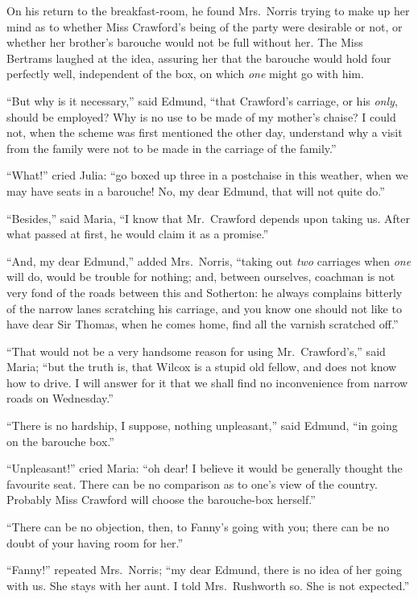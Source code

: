 \documentclass{article}
\begin{document}
On his return to the breakfast-room, he found Mrs.\ Norris
trying to make up her mind as to whether Miss Crawford's
being of the party were desirable or not, or whether
her brother's barouche would not be full without her.
The Miss Bertrams laughed at the idea, assuring her
that the barouche would hold four perfectly well,
independent of the box, on which \emph{one} might go with him.

``But why is it necessary,'' said Edmund, ``that Crawford's carriage,
or his \emph{only}, should be employed?  Why is no use to be
made of my mother's chaise?  I could not, when the scheme
was first mentioned the other day, understand why a visit
from the family were not to be made in the carriage of the family.''

``What!'' cried Julia:  ``go boxed up three in a postchaise
in this weather, when we may have seats in a barouche!
No, my dear Edmund, that will not quite do.''

``Besides,'' said Maria, ``I know that Mr.\ Crawford depends
upon taking us.  After what passed at first, he would
claim it as a promise.''

``And, my dear Edmund,'' added Mrs.\ Norris, ``taking out \emph{two}
carriages when \emph{one} will do, would be trouble for nothing;
and, between ourselves, coachman is not very fond of the
roads between this and Sotherton:  he always complains
bitterly of the narrow lanes scratching his carriage,
and you know one should not like to have dear Sir Thomas,
when he comes home, find all the varnish scratched off.''

``That would not be a very handsome reason for using
Mr.\ Crawford's,'' said Maria; ``but the truth is, that Wilcox
is a stupid old fellow, and does not know how to drive.
I will answer for it that we shall find no inconvenience
from narrow roads on Wednesday.''

``There is no hardship, I suppose, nothing unpleasant,''
said Edmund, ``in going on the barouche box.''

``Unpleasant!'' cried Maria:  ``oh dear!  I believe it would
be generally thought the favourite seat.  There can
be no comparison as to one's view of the country.
Probably Miss Crawford will choose the barouche-box herself.''

``There can be no objection, then, to Fanny's going with you;
there can be no doubt of your having room for her.''

``Fanny!'' repeated Mrs.\ Norris; ``my dear Edmund, there is
no idea of her going with us.  She stays with her aunt.
I told Mrs.\ Rushworth so.  She is not expected.''
\end{document}
